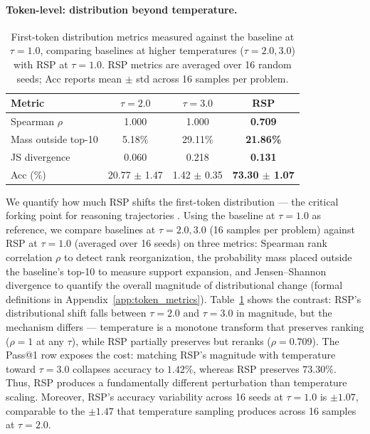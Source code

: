 \paragraph{Token-level: distribution beyond temperature.}
\begin{table}
  \vspace{-1.2em}
  \centering
  \caption{First-token distribution metrics measured against the baseline at $\tau{=}1.0$, comparing baselines at higher temperatures ($\tau{=}2.0, 3.0$) with RSP at $\tau{=}1.0$. RSP metrics are averaged over 16 random seeds; Acc reports mean $\pm$ std across 16 samples per problem.}
  \label{tab:rsp_vs_temp}
  \footnotesize
  \setlength{\tabcolsep}{3.5pt}
  \renewcommand{\arraystretch}{0.9}
  \begin{tabular}{lccc}
    \toprule
    \textbf{Metric} & \textbf{$\tau{=}2.0$} & \textbf{$\tau{=}3.0$} & \cellcolor{blue!10}\textbf{RSP} \\
    \midrule
    Spearman $\rho$ & 1.000 & 1.000 & \cellcolor{blue!10}\textbf{0.709} \\
    Mass outside top-10 & 5.18\% & 29.11\% & \cellcolor{blue!10}\textbf{21.86\%} \\
    JS divergence & 0.060 & 0.218 & \cellcolor{blue!10}\textbf{0.131} \\
    Acc (\%) & 20.77 $\pm$ 1.47 & 1.42 $\pm$ 0.35 & \cellcolor{blue!10}\textbf{73.30 $\pm$ 1.07} \\
    \bottomrule
  \end{tabular}
\end{table}
We quantify how much RSP shifts the first-token distribution --- the critical forking point for reasoning trajectories \citep{wang2025beyond}. Using the baseline at $\tau{=}1.0$ as reference, we compare baselines at $\tau{=}2.0,3.0$ (16 samples per problem) against RSP at $\tau{=}1.0$ (averaged over 16 seeds) on three metrics: Spearman rank correlation $\rho$ to detect rank reorganization, the probability mass placed outside the baseline's top-10 to measure support expansion, and Jensen--Shannon divergence to quantify the overall magnitude of distributional change (formal definitions in Appendix~\ref{app:token_metrics}). Table~\ref{tab:rsp_vs_temp} shows the contrast: RSP's distributional shift falls between $\tau{=}2.0$ and $\tau{=}3.0$ in magnitude, but the mechanism differs --- temperature is a monotone transform that preserves ranking ($\rho=1$ at any $\tau$), while RSP partially preserves but reranks ($\rho=0.709$). The Pass@1 row exposes the cost: matching RSP's magnitude with temperature toward $\tau{=}3.0$ collapses accuracy to $1.42\%$, whereas RSP preserves $73.30\%$. Thus, RSP produces a fundamentally different perturbation than temperature scaling. Moreover, RSP's accuracy variability across 16 seeds at $\tau{=}1.0$ is $\pm 1.07$, comparable to the $\pm 1.47$ that temperature sampling produces across 16 samples at $\tau{=}2.0$.

